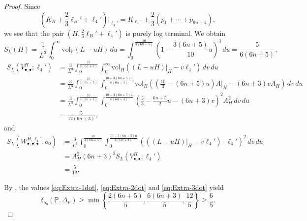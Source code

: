 \documentclass[12pt]{amsart}
\theoremstyle{definition}
\theoremstyle{remark}
\begin{document}
\begin{proof}
Since
\[\left(K_{H}+\frac{2}{3}\ell_B'+\ell_4'\right)\Big|_{\ell_4'}=K_{\ell_4'}+\frac{2}{3}\left(p_1+\cdots+p_{6n+4}\right),\]
we see that the pair $(H, \frac{2}{3}\ell_B'+\ell_4')$ is purely log terminal.
We obtain
\begin{equation}\label{eq:Extra-1dot}
S_L(H) =\frac{1}{L^3} \int_0^{\infty} \mathrm{vol}_\mathbb{P}(L - u H) \,du=
\int_0^{\frac{10}{3(6n+5)}}  \left(1 - \frac{3(6n+5)}{10} u\right)^3 \,du=\frac{5}{6(6n+5)},
\end{equation}
\begin{equation}\label{eq:Extra-2dot}
\begin{split}
S_L  (V_{\bullet, \bullet}^{H}; \mathfrak{\ell_4'}) 
&= \frac{3}{L^3} \int_0^{\frac{10}{3(6n+5)}} \int_0^{\infty} \mathrm{vol}_{H} \left(\left(L - u H\right)|_{H} - v \ell_4'\right) \,dv \,du \\
&= \frac{3}{L^3} \int_0^{\frac{10}{3(6n+5)}} \int_0^{\frac{10-3(6n+5)u}{6(6n+3)}} \mathrm{vol}_{H} \left(\left(\frac{10}{3} - (6n+5)u \right)A|_{H} - (6n+3)v A_H\right) \,dv \,du \\
&= \frac{3}{L^3} \int_0^{\frac{10}{3(6n+5)}} \int_0^{\frac{10-3(6n+5)u}{6(6n+3)}} \left(\frac{5}{3}-\frac{6n+5}{2}u- (6n+3)v \right)^2 A_H^2 \,dv \,du \\
&= \frac{5}{12(6n+3)},
\end{split}
\end{equation}
and
\begin{equation}\label{eq:Extra-3dot}
\begin{split}
S_L (W_{\bullet, \bullet, \bullet}^{H, \ell_4'}; o_0) 
&= \frac{3}{L^3}\int_0^{\frac{10}{3(6n+5)}}  \int_0^{\frac{10-3(6n+5)u}{6(6n+3)}}\left( \left(\left(L - u H\right)|_{H} - v \ell_4'\right) \cdot\ell_4'\right)^2\,dv \,du \\
&= A_H^2(6n+3)^2  S_L  (V_{\bullet, \bullet}^{H}; \mathfrak{\ell_4'}) \\
&= \frac{5}{12}.
\end{split}
\end{equation}





By \cite[Corollary~4.8]{Fu23}, the values \eqref{eq:Extra-1dot}, \eqref{eq:Extra-2dot} and \eqref{eq:Extra-3dot} yield
\[\delta_{o_0}\left(\mathbb{P}, \Delta_\mathbb{P}\right)\geq \min\left\{\frac{2(6n+5)}{5},  \frac{6(6n+3)}{5}, \frac{12}{5}\right\}\geq\frac{6}{5}.\]





\end{proof}
\end{document}
